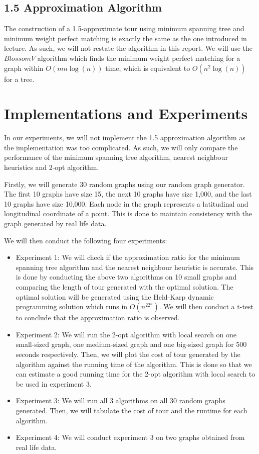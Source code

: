 \documentclass[paper=a4, fontsize=11pt]{scrartcl}	%
\numberwithin{equation}{section}		%
\numberwithin{figure}{section}			%
\numberwithin{table}{section}				%
\begin{document}
\subsection{1.5 Approximation Algorithm}
The construction of a 1.5-approximate tour using minimum spanning tree and minimum weight perfect matching is exactly the same as the one introduced in lecture. As such, we will not restate the algorithm in this report. We will use the $Blossom V$ algorithm \cite{kolmogorov} which finds the minimum weight perfect matching for a graph within $O(mn \log(n))$ time, which is equivalent to $O(n^2 \log(n))$ for a tree.

\section{Implementations and Experiments}

In our experiments, we will not implement the 1.5 approximation algorithm as the implementation was too complicated. As such, we will only compare the performance of the minimum spanning tree algorithm, nearest neighbour heuristics and 2-opt algorithm. 

Firstly, we will generate 30 random graphs using our random graph generator. The first 10 graphs have size 15, the next 10 graphs have size 1,000, and the last 10 graphs have size 10,000. Each node in the graph represents a latitudinal and longitudinal coordinate of a point. This is done to maintain consistency with the graph generated by real life data.

We will then conduct the following four experiments:

\begin{itemize}
\item Experiment 1: We will check if the approximation ratio for the minimum spanning tree algorithm and the nearest neighbour heuristic is accurate. This is done by conducting the above two algorithms on 10 small graphs and comparing the length of tour generated with the optimal solution. The optimal solution will be generated using the Held-Karp dynamic programming solution which runs in $O(n^22^n)$. We will then conduct a t-test to conclude that the approximation ratio is observed.
\item Experiment 2: We will run the 2-opt algorithm with local search on one small-sized graph, one medium-sized graph and one big-sized graph for 500 seconds respectively. Then, we will plot the cost of tour generated by the algorithm against the running time of the algorithm. This is done so that we can estimate a good running time for the 2-opt algorithm with local search to be used in experiment 3.
\item Experiment 3: We will run all 3 algorithms on all 30 random graphs generated. Then, we will tabulate the cost of tour and the runtime for each algorithm.
\item Experiment 4: We will conduct experiment 3 on two graphs obtained from real life data.
\end{itemize}
\end{document}
